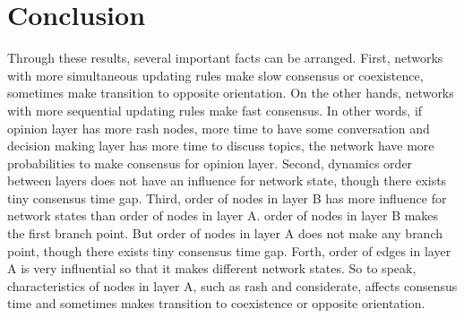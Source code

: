 \section{Conclusion}
Through these results, several important facts can be arranged. First, networks with more simultaneous updating rules make slow consensus or coexistence, sometimes make transition to opposite orientation. On the other hands, networks with more sequential updating rules make fast consensus. In other words, if opinion layer has more rash nodes, more time to have some conversation and decision making layer has more time to  discuss topics, the network have more probabilities to make consensus for opinion layer. Second, dynamics order between layers does not have an influence for network state, though there exists tiny consensus time gap. Third, order of nodes in layer B has more influence for network states than order of nodes in layer A. order of nodes in layer B makes the first branch point. But order of nodes in layer A does not make any branch point, though there exists tiny consensus time gap. Forth, order of edges in layer A is very influential so that it makes different network states. So to speak, characteristics of nodes in layer A, such as rash and considerate, affects consensus time and sometimes makes transition to coexistence or opposite orientation. 